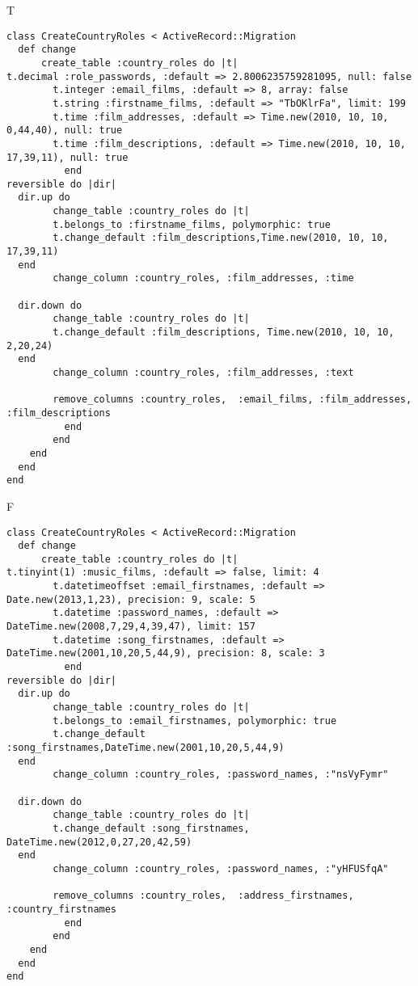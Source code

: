 T
\begin{verbatim}
class CreateCountryRoles < ActiveRecord::Migration
  def change
	  create_table :country_roles do |t|
t.decimal :role_passwords, :default => 2.8006235759281095, null: false
		t.integer :email_films, :default => 8, array: false
		t.string :firstname_films, :default => "TbOKlrFa", limit: 199
		t.time :film_addresses, :default => Time.new(2010, 10, 10, 0,44,40), null: true
		t.time :film_descriptions, :default => Time.new(2010, 10, 10, 17,39,11), null: true
		  end
reversible do |dir|
  dir.up do
		change_table :country_roles do |t|
		t.belongs_to :firstname_films, polymorphic: true
 		t.change_default :film_descriptions,Time.new(2010, 10, 10, 17,39,11)
  end
 		change_column :country_roles, :film_addresses, :time
   
  dir.down do
		change_table :country_roles do |t|
		t.change_default :film_descriptions, Time.new(2010, 10, 10, 2,20,24)
  end
 		change_column :country_roles, :film_addresses, :text
   
		remove_columns :country_roles,  :email_films, :film_addresses, :film_descriptions 
	      end
	    end
    end 
  end
end

\end{verbatim}

F
\begin{verbatim}
class CreateCountryRoles < ActiveRecord::Migration
  def change
	  create_table :country_roles do |t|
t.tinyint(1) :music_films, :default => false, limit: 4
		t.datetimeoffset :email_firstnames, :default => Date.new(2013,1,23), precision: 9, scale: 5
		t.datetime :password_names, :default => DateTime.new(2008,7,29,4,39,47), limit: 157
		t.datetime :song_firstnames, :default => DateTime.new(2001,10,20,5,44,9), precision: 8, scale: 3
		  end
reversible do |dir|
  dir.up do
		change_table :country_roles do |t|
		t.belongs_to :email_firstnames, polymorphic: true
 		t.change_default :song_firstnames,DateTime.new(2001,10,20,5,44,9)
  end
 		change_column :country_roles, :password_names, :"nsVyFymr"
   
  dir.down do
		change_table :country_roles do |t|
		t.change_default :song_firstnames, DateTime.new(2012,0,27,20,42,59)
  end
 		change_column :country_roles, :password_names, :"yHFUSfqA"
   
		remove_columns :country_roles,  :address_firstnames, :country_firstnames 
	      end
	    end
    end 
  end
end

\end{verbatim}


